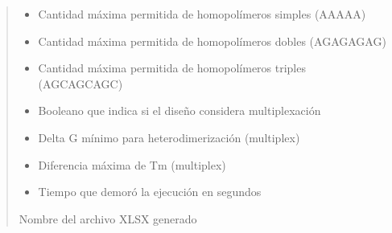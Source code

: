 \documentclass[letterpaper,10pt,spanish]{sphinxmanual}
\begin{document}
\begin{fulllineitems}
\begin{quote}
\begin{description}
\begin{itemize}
\item {} 
\sphinxAtStartPar
{} \textendash{} Cantidad máxima permitida de homopolímeros simples (AAAAA)

\item {} 
\sphinxAtStartPar
{} \textendash{} Cantidad máxima permitida de homopolímeros dobles (AGAGAGAG)

\item {} 
\sphinxAtStartPar
{} \textendash{} Cantidad máxima permitida de homopolímeros triples (AGCAGCAGC)

\item {} 
\sphinxAtStartPar
{} \textendash{} Booleano que indica si el diseño considera multiplexación

\item {} 
\sphinxAtStartPar
{} \textendash{} Delta G mínimo para heterodimerización (multiplex)

\item {} 
\sphinxAtStartPar
{} \textendash{} Diferencia máxima de Tm (multiplex)

\item {} 
\sphinxAtStartPar
{} \textendash{} Tiempo que demoró la ejecución en segundos

\end{itemize}

\sphinxAtStartPar
Nombre del archivo XLSX generado

\end{description}\end{quote}

\end{fulllineitems}

\end{document}
